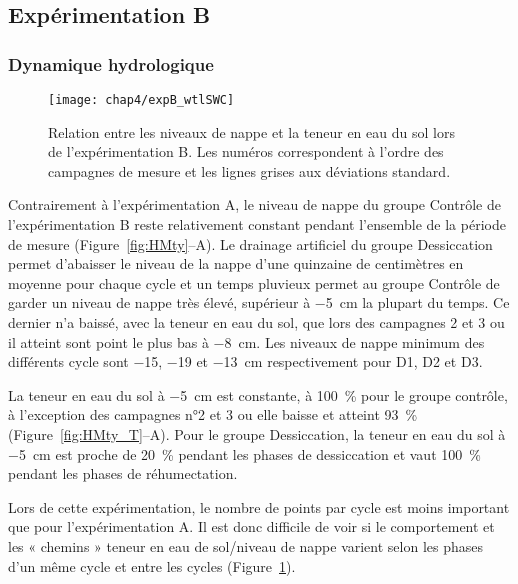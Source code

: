 \subsection{Expérimentation B}

\subsubsection{Dynamique hydrologique}

\begin{figure}
\centering
\texttt{[image: chap4/expB\_wtlSWC]}
\caption{Relation entre les niveaux de nappe et la teneur en eau du sol lors de l'expérimentation B. Les numéros correspondent à l'ordre des campagnes de mesure et les lignes grises aux déviations standard.}
\label{fig:wtlSWC_B}
\end{figure}

Contrairement à l'expérimentation A, le niveau de nappe du groupe Contrôle de l'expérimentation B reste relativement constant pendant l'ensemble de la période de mesure (Figure~\ref{fig:HMty}--A).
Le drainage artificiel du groupe Dessiccation permet d'abaisser le niveau de la nappe d'une quinzaine de centimètres en moyenne pour chaque cycle et un temps pluvieux permet au groupe Contrôle de garder un niveau de nappe très élevé, supérieur à \SI{-5}{\centi\metre} la plupart du temps.
Ce dernier n'a baissé, avec la teneur en eau du sol, que lors des campagnes 2 et 3 ou il atteint sont point le plus bas à \SI{-8}{\centi\metre}.
Les niveaux de nappe minimum des différents cycle sont \num{-15}, \num{-19} et \SI{-13}{\centi\metre} respectivement pour D1, D2 et D3.

La teneur en eau du sol à \SI{-5}{\centi\metre} est constante, à \SI{100}{\percent} pour le groupe contrôle, à l'exception des campagnes n°2 et 3 ou elle baisse et atteint \SI{93}{\percent} (Figure~\ref{fig:HMty_T}--A).
Pour le groupe Dessiccation, la teneur en eau du sol à \SI{-5}{\centi\metre} est proche de \SI{20}{\percent} pendant les phases de dessiccation et vaut \SI{100}{\percent} pendant les phases de réhumectation.

Lors de cette expérimentation, le nombre de points par cycle est moins important que pour l'expérimentation A.
Il est donc difficile de voir si le comportement et les « chemins » teneur en eau de sol/niveau de nappe varient selon les phases d'un même cycle et entre les cycles (Figure~\ref{fig:wtlSWC_B}).


